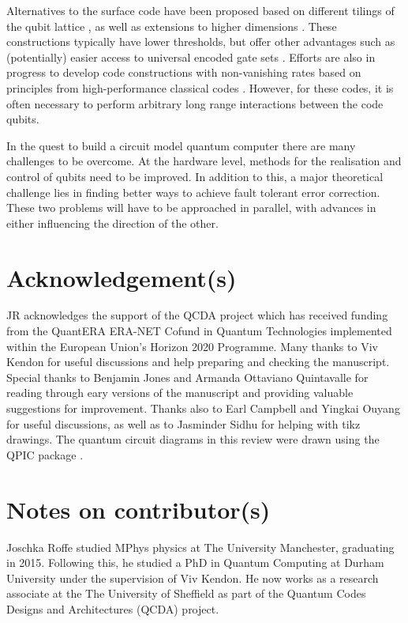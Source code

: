 \documentclass[]{arxiv}
\theoremstyle{plain}%
\theoremstyle{definition}
\theoremstyle{remark}
\begin{document}
Alternatives to the surface code have been proposed based on different tilings of the qubit lattice \cite{Bombin2007}, as well as extensions to higher dimensions \cite{Breuckmann16,Vasmer18}. These constructions typically have lower thresholds, but offer other advantages such as (potentially) easier access to universal encoded gate sets \cite{Vasmer18}. Efforts are also in progress to develop code constructions with non-vanishing rates based on principles from high-performance classical codes \cite{Gottesman14,Tillich14}. However, for these codes, it is often necessary to perform arbitrary long range interactions between the code qubits.

In the quest to build a circuit model quantum computer there are many challenges to be overcome. At the hardware level, methods for the realisation and control of qubits need to be improved. In addition to this, a major theoretical challenge lies in finding better ways to achieve fault tolerant error correction. These two problems will have to be approached in parallel, with advances in either influencing the direction of the other.








\section*{Acknowledgement(s)}

JR acknowledges the support of the QCDA project which has received funding from the QuantERA ERA-NET Cofund in Quantum Technologies implemented within the European Union’s Horizon 2020 Programme. Many thanks to Viv Kendon for useful discussions and help preparing and checking the manuscript. Special thanks to Benjamin Jones and Armanda Ottaviano Quintavalle for reading through eary versions of the manuscript and providing valuable suggestions for improvement. Thanks also to Earl Campbell and Yingkai Ouyang for useful discussions, as well as to Jasminder Sidhu for helping with tikz drawings. The quantum circuit diagrams in this review were drawn using the QPIC package \cite{qpic}.




\section*{Notes on contributor(s)}

Joschka Roffe studied MPhys physics at The University Manchester, graduating in 2015. Following this, he studied a PhD in Quantum Computing at Durham University under the supervision of Viv Kendon. He now works as a research associate at the The University of Sheffield as part of the Quantum Codes Designs and Architectures (QCDA) project. 
\end{document}
